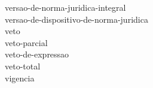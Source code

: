  \hspace*{1.0cm}\glosshsep \Gls{versao-de-norma-juridica-integral} \\ 
 \hspace*{1.0cm}\glosshsep \Gls{versao-de-dispositivo-de-norma-juridica} \\ 
\Gls{veto} \\ 
 \hspace*{1.0cm}\glosshsep \Gls{veto-parcial} \\ 
 \hspace*{2.0cm}\glosshsep \Gls{veto-de-expressao} \\ 
 \hspace*{1.0cm}\glosshsep \Gls{veto-total} \\ 
\Gls{vigencia} \\ 
